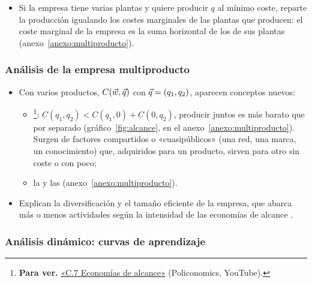 \documentclass[11pt]{article}
\begin{document}
\begin{itemize}
\item Si la empresa tiene varias plantas y quiere producir $q$ al mínimo coste, reparte la producción igualando los costes marginales de las plantas que producen: el coste marginal de la empresa es la suma horizontal de los de sus plantas (anexo~\ref{anexo:multiproducto}).
\end{itemize}

\subsubsection{Análisis de la empresa multiproducto}\label{sec:analisis-empresa-multiproducto}

\begin{itemize}
\item Con varios productos, $C(\vec{w},\vec{q})$ con $\vec{q}=(q_1,q_2)$, aparecen conceptos nuevos\nocite{BaumolPanzarWillig1982Contestable}:
  \begin{itemize}
  \item {}\footnote{\textbf{Para ver.} \href{https://www.youtube.com/watch?v=C3aW04WuLfE}{«C.7 Economías de alcance»} (Policonomics, YouTube).}: $C(q_1,q_2)<C(q_1,0)+C(0,q_2)$, producir juntos es más barato que por separado (gráfico~\ref{fig:alcance}, en el anexo~\ref{anexo:multiproducto}). Surgen de factores compartidos o «cuasipúblicos» (una red, una marca, un conocimiento) que, adquiridos para un producto, sirven para otro sin coste o con poco\nocite{PanzarWillig1981Economies};
  \item la  y las  (anexo~\ref{anexo:multiproducto}).
  \end{itemize}
\item Explican la diversificación y el tamaño eficiente de la empresa, que abarca más o menos actividades según la intensidad de las economías de alcance  .
\end{itemize}

\subsubsection{Análisis dinámico: curvas de aprendizaje}\label{sec:analisis-dinamico-curvas}
\end{document}
